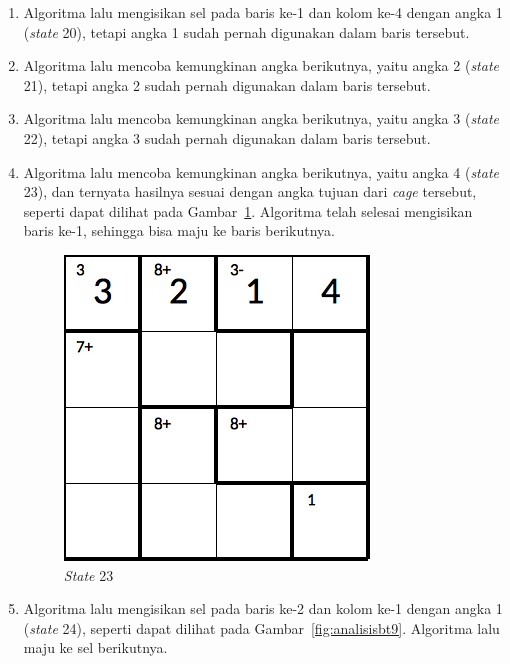 \begin{enumerate}
\item Algoritma lalu mengisikan sel pada baris ke-1 dan kolom ke-4 dengan angka 1 (\textit{state} 20), tetapi angka 1 sudah pernah digunakan dalam baris tersebut.
\item Algoritma lalu mencoba kemungkinan angka berikutnya, yaitu angka 2 (\textit{state} 21), tetapi angka 2 sudah pernah digunakan dalam baris tersebut.
\item Algoritma lalu mencoba kemungkinan angka berikutnya, yaitu angka 3 (\textit{state} 22), tetapi angka 3 sudah pernah digunakan dalam baris tersebut.
\item Algoritma lalu mencoba kemungkinan angka berikutnya, yaitu angka 4 (\textit{state} 23), dan ternyata hasilnya sesuai dengan angka tujuan dari \textit{cage} tersebut, seperti dapat dilihat pada Gambar~\ref{fig:analisisbt8}. Algoritma telah selesai mengisikan baris ke-1, sehingga bisa maju ke baris berikutnya.

\begin{figure}
\centering
\captionsetup{justification=centering}
\includegraphics[scale=0.333]{Gambar/backtracking/State23}
\caption[\textit{State} 23]{\textit{State} 23}
\label{fig:analisisbt8}
\end{figure}

\item Algoritma lalu mengisikan sel pada baris ke-2 dan kolom ke-1 dengan angka 1 (\textit{state} 24), seperti dapat dilihat pada Gambar~\ref{fig:analisisbt9}. Algoritma lalu maju ke sel berikutnya.


\end{enumerate}
